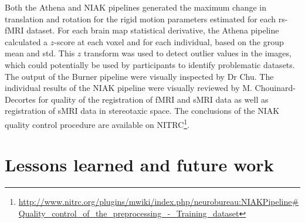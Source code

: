 \documentclass[preprint,12pt,3p]{elsarticle}
\begin{document}
Both the Athena and NIAK pipelines generated the maximum change in translation and rotation for the rigid motion parameters estimated for each rs-fMRI dataset. For each brain map statistical derivative, the Athena pipeline calculated a $z$-score at each voxel and for each individual, based on the group mean and std. This $z$ transform was used to detect outlier values in the images, which could potentially be used by participants to identify problematic datasets. The output of the Burner pipeline were visually inspected by Dr Chu. The individual results of the NIAK pipeline were visually reviewed by M. Chouinard-Decortes for quality of the registration of fMRI and sMRI data as well as registration of sMRI data in stereotaxic space. The conclusions of the NIAK quality control procedure are available on NITRC\footnote{\url{http://www.nitrc.org/plugins/mwiki/index.php/neurobureau:NIAKPipeline#Quality_control_of_the_preprocessing_-_Training_dataset}}.

\section{Lessons learned and future work}
\end{document}
